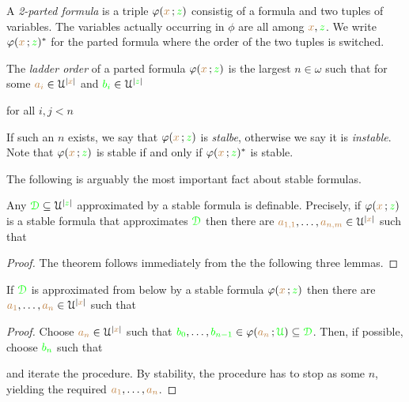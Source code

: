 \documentclass[creche.tex]{subfiles}
\begin{document}
\begin{definition}\label{def_parted-fla}
A \emph{2-parted formula\/} is a triple $\varphi({\color{brown} x}\,;{\color{green} z})$ consistig of a formula and two tuples of variables. The variables actually occurring in $\phi$ are all among ${\color{brown} x},{\color{green} z}$. We write $\varphi({\color{brown} x}\,;{\color{green} z})^*$ for the parted formula where the order of the two tuples is switched.
\end{definition}


The \emph{ladder order\/} of a parted formula $\varphi({\color{brown} x}\,;{\color{green} z})$ is the largest $n\in\omega$ such that for some ${\color{brown} a_i}\in\EuScript U^{|{\color{brown} x}|}$ and ${\color{green} b_i}\in\EuScript U^{|{\color{green} z}|}$ 

\hfill for all $i,j<n$

If such an $n$ exists, we say that  $\varphi({\color{brown} x}\,;{\color{green} z})$ is \emph{stalbe}, otherwise we say it is \emph{instable}. Note that $\varphi({\color{brown} x}\,;{\color{green} z})$ is stable if and only if $\varphi({\color{brown} x}\,;{\color{green} z})^*$ is stable.

The following is arguably the most important fact about stable formulas.

\begin{theorem}\label{thm_def_stable_formula}
Any ${\color{green}\EuScript D}\subseteq\EuScript U^{|{\color{green} z}|}$ approximated by a stable formula is definable. Precisely, if $\varphi({\color{brown} x}\,;{\color{green} z})$ is a stable formula that approximates ${\color{green}\EuScript D}$ then there are ${\color{brown} a_{1,1}},\dots,{\color{brown} a_{n,m}}\in\EuScript U^{|{\color{brown} x}|}$ such that 




\end{theorem}

\begin{proof}
The theorem follows immediately from the the following three lemmas.
\end{proof}





\begin{lemma}
If ${\color{green}\EuScript D}$ is approximated from below by a stable formula $\varphi({\color{brown} x}\,;{\color{green} z})$ then there are ${\color{brown} a_1},\dots,{\color{brown} a_n}\in\EuScript U^{|{\color{brown} x}|}$ such that 




\end{lemma}

\begin{proof}
Choose ${\color{brown} a_n}\in\EuScript U^{|{\color{brown} x}|}$ such that ${\color{green} b_0},\dots,{\color{green} b_{n-1}}\in\varphi({\color{brown} a_n}\,;{\color{green}\EuScript U})\subseteq{\color{green}\EuScript D}$. Then, if possible, choose ${\color{green} b_n}$ such that


and iterate the procedure. By stability, the procedure has to stop as some $n$, yielding the required  ${\color{brown} a_1},\dots,{\color{brown} a_n}$.
\end{proof}
\end{document}
